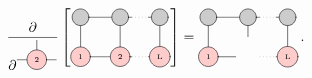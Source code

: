 \documentclass[twoside,twocolumn,9pt]{article}
\begin{document}
\begin{equation}\label{eq:gradient-1}
  \pderivative{\begin{tikzpicture}
    \draw[gray, thick] (0,0) -- (1,0);
    \draw[gray, thick] (0.5,0) -- (0.5,0.5);
    \node[draw, circle, line cap=round, fill=red!20] at (0.5,0) {\tiny 2};
  \end{tikzpicture}} \left[ \begin{tikzpicture}[baseline={([yshift=-.5ex]current bounding box.center)}]
    \draw[gray, thick] (0,0) -- (0,-1);
    \draw[gray, thick] (1,0) -- (1,-1);
    \draw[gray, thick] (2,0) -- (2,-1);

    \draw[gray, thick] (0,0) -- (1.3,0);
    \draw[gray, dotted] (1.3,0) -- (1.7,0);
    \draw[gray, thick] (1.7,0) -- (2.0,0);

    \draw[gray, thick] (0,-1) -- (1.3,-1);
    \draw[gray, dotted] (1.3,-1) -- (1.7,-1);
    \draw[gray, thick] (1.7,-1) -- (2.0,-1);

    \node[draw, circle, line cap=round, fill=black!20, minimum size=12] at (0,0) {  };
    \node[draw, circle, line cap=round, fill=black!20, minimum size=12] at (1,0) {  };
    \node[draw, circle, line cap=round, fill=black!20, minimum size=12] at (2,0) {  };

    \node[draw, circle, line cap=round, fill=red!20] at (0,-1) {\tiny 1};
    \node[draw, circle, line cap=round, fill=red!20] at (1,-1) {\tiny 2};
    \node[draw, circle, line cap=round, fill=red!20] at (2,-1) {\tiny L};
  \end{tikzpicture} \right] = 
  \begin{tikzpicture}[baseline={([yshift=-.5ex]current bounding box.center)}]
    \draw[gray, thick] (0,0) -- (0,-1);
    \draw[gray, thick] (1,0) -- (1,-0.5);
    \draw[gray, thick] (2,0) -- (2,-1);

    \draw[gray, thick] (0,0) -- (1.3,0);
    \draw[gray, dotted] (1.3,0) -- (1.7,0);
    \draw[gray, thick] (1.7,0) -- (2.0,0);

    \draw[gray, thick] (0,-1) -- (0.7,-1);
    \draw[gray, dotted] (1.3,-1) -- (1.7,-1);
    \draw[gray, thick] (1.7,-1) -- (2.0,-1);

    \node[draw, circle, line cap=round, fill=black!20, minimum size=12] at (0,0) {  };
    \node[draw, circle, line cap=round, fill=black!20, minimum size=12] at (1,0) {  };
    \node[draw, circle, line cap=round, fill=black!20, minimum size=12] at (2,0) {  };

    \node[draw, circle, line cap=round, fill=red!20] at (0,-1) {\tiny 1};
    \node[draw, circle, line cap=round, fill=red!20] at (2,-1) {\tiny L};
  \end{tikzpicture} \thinspace .
\end{equation}
\end{document}
